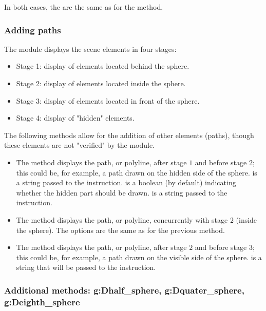 In both cases, the  are the same as for the  method.

\subsubsection{Adding paths}

The module displays the scene elements in four stages:
\begin{itemize}
\item Stage 1: display of elements located behind the sphere. 
\item Stage 2: display of elements located inside the sphere. 
\item Stage 3: display of elements located in front of the sphere. 
\item Stage 4: display of "hidden" elements.
\end{itemize}

The following methods allow for the addition of other elements (paths), though these elements are not "verified" by the module.
\begin{itemize}
    \item The method  displays the path, or polyline,  after stage $1$ and before stage $2$; this could be, for example, a path drawn on the hidden side of the sphere.  is a string passed to the \drawcmd instruction.  is a boolean (\false by default) indicating whether the hidden part should be drawn.  is a string passed to the \drawcmd instruction. 

    \item The method  displays the path, or polyline,  concurrently with stage $2$ (inside the sphere). The options are the same as for the previous method. 

    \item The method  displays the path, or polyline,  after stage $2$ and before stage $3$; this could be, for example, a path drawn on the visible side of the sphere.  is a string that will be passed to the \drawcmd instruction.
\end{itemize}

\subsubsection{Additional methods: g:Dhalf\_sphere, g:Dquater\_sphere, g:Deighth\_sphere}

